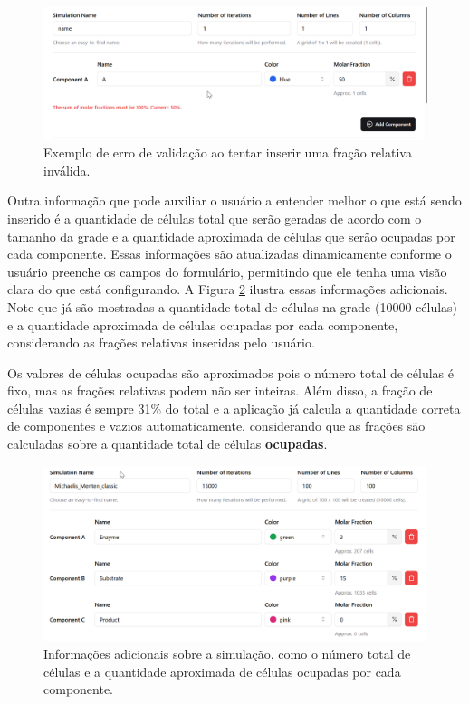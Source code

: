 \documentclass[12pt,oneside]{report}
\begin{document}
\begin{figure}[H]
    \centering
    \includegraphics[width=1\textwidth]{validacao.png}
    \caption{\small Exemplo de erro de validação ao tentar inserir uma fração relativa inválida.}
    \label{fig:validacao}
\end{figure}

Outra informação que pode auxiliar o usuário a entender melhor o que está sendo inserido é a quantidade de células total que serão geradas de acordo com o tamanho da grade e a quantidade aproximada de células que serão ocupadas por cada componente. Essas informações são atualizadas dinamicamente conforme o usuário preenche os campos do formulário, permitindo que ele tenha uma visão clara do que está configurando. A Figura \ref{fig:informacoes} ilustra essas informações adicionais. Note que já são mostradas a quantidade total de células na grade (10000 células) e a quantidade aproximada de células ocupadas por cada componente, considerando as frações relativas inseridas pelo usuário.

Os valores de células ocupadas são aproximados pois o número total de células é fixo, mas as frações relativas podem não ser inteiras. Além disso, a fração de células vazias é sempre 31\% do total e a aplicação já calcula a quantidade correta de componentes e vazios automaticamente, considerando que as frações são calculadas sobre a quantidade total de células \textbf{ocupadas}.

\begin{figure}[H]
    \centering
    \includegraphics[width=1\textwidth]{calculo_celulas.png}
    \caption{\small Informações adicionais sobre a simulação, como o número total de células e a quantidade aproximada de células ocupadas por cada componente.}
    \label{fig:informacoes}
\end{figure}
\end{document}
